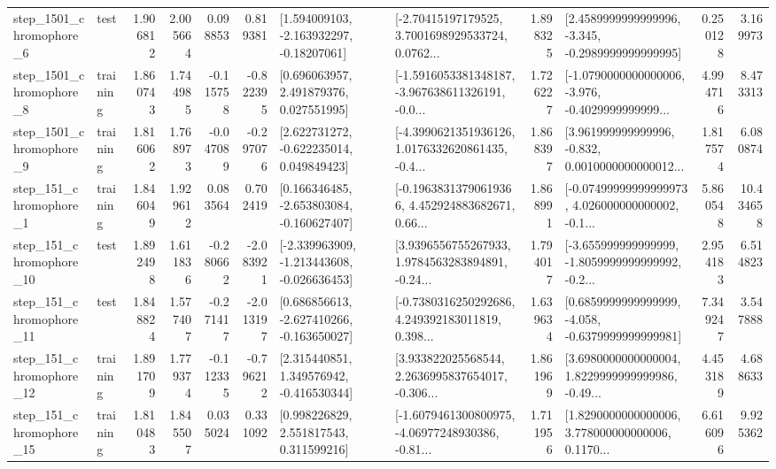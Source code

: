 \begin{tabular}{llrrrrllrlrr}
  step\_1501\_chromophore\_6 &      test &      1.906812 &    2.005664 &      0.098853 &  0.819381 &    [1.594009103, -2.163932297, -0.18207061] &  [-2.70415197179525, 3.7001698929533724, 0.0762... &       1.898325 &  [2.4589999999999996, -3.345, -0.2989999999999995] &            0.250128 &          3.169973 \\
  step\_1501\_chromophore\_8 &  training &      1.860743 &    1.744985 &     -0.115758 & -0.822395 &     [0.696063957, 2.491879376, 0.027551995] &  [-1.5916053381348187, -3.967638611326191, -0.0... &       1.726227 &  [-1.0790000000000006, -3.976, -0.4029999999999... &            4.994716 &          8.473313 \\
  step\_1501\_chromophore\_9 &  training &      1.816062 &    1.768973 &     -0.047089 & -0.297076 &    [2.622731272, -0.622235014, 0.049849423] &  [-4.3990621351936126, 1.0176332620861435, -0.4... &       1.868397 &  [3.961999999999996, -0.832, 0.0010000000000012... &            1.817574 &          6.080874 \\
   step\_151\_chromophore\_1 &  training &      1.846049 &    1.929612 &      0.083564 &  0.702419 &   [0.166346485, -2.653803084, -0.160627407] &  [-0.19638313790619366, 4.452924883682671, 0.66... &       1.868991 &  [-0.07499999999999973, 4.026000000000002, -0.1... &            5.860548 &         10.434658 \\
  step\_151\_chromophore\_10 &      test &      1.892498 &    1.611836 &     -0.280662 & -2.083921 &  [-2.339963909, -1.213443608, -0.026636453] &  [3.9396556755267933, 1.9784563283894891, -0.24... &       1.794017 &  [-3.655999999999999, -1.8059999999999992, -0.2... &            2.954183 &          6.514823 \\
  step\_151\_chromophore\_11 &      test &      1.848824 &    1.577407 &     -0.271417 & -2.013197 &   [0.686856613, -2.627410266, -0.163650027] &  [-0.7380316250292686, 4.249392183011819, 0.398... &       1.639634 &  [0.6859999999999999, -4.058, -0.6379999999999981] &            7.349247 &          3.547888 \\
  step\_151\_chromophore\_12 &  training &      1.891709 &    1.779374 &     -0.112335 & -0.796212 &    [2.315440851, 1.349576942, -0.416530344] &  [3.933822025568544, 2.2636995837654017, -0.306... &       1.861969 &  [3.6980000000000004, 1.8229999999999986, -0.49... &            4.453189 &          4.688633 \\
  step\_151\_chromophore\_15 &  training &      1.810483 &    1.845507 &      0.035024 &  0.331092 &     [0.998226829, 2.551817543, 0.311599216] &  [-1.6079461300800975, -4.06977248930386, -0.81... &       1.711956 &  [1.8290000000000006, 3.778000000000006, 0.1170... &            6.616096 &          9.925362 \\

\end{tabular}
